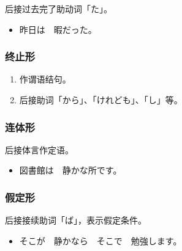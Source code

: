 后接过去完了助动词「た」。
\begin{itemize}
  \item 昨日は　暇だった。
\end{itemize}


\subsubsection{终止形}%

\begin{enumerate}
  \item 作谓语结句。
  \item 后接助词「から」、「けれども」、「し」等。
\end{enumerate}


\subsubsection{连体形}%

后接体言作定语。
\begin{itemize}
  \item 図書館は　静かな所です。
\end{itemize}


\subsubsection{假定形}%

后接接续助词「ば」，表示假定条件。
\begin{itemize}
  \item そこが　静かなら　そこで　勉強します。
\end{itemize}

